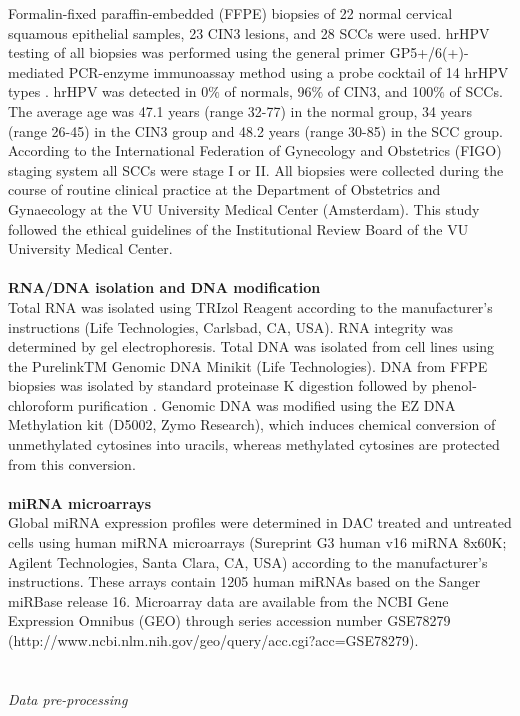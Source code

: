 Formalin-fixed paraffin-embedded (FFPE) biopsies of 22 normal cervical squamous epithelial samples, 23 CIN3 lesions, and 28 SCCs were used. hrHPV testing of all biopsies was performed using the general primer GP5+/6(+)-mediated PCR-enzyme immunoassay method using a probe cocktail of 14 hrHPV types \cite{Jacobs1997}. hrHPV was detected in 0$\%$ of normals, 96$\%$ of CIN3, and 100$\%$ of SCCs. The average age was 47.1 years (range 32-77) in the normal group, 34 years (range 26-45) in the CIN3 group and 48.2 years (range 30-85) in the SCC group. According to the International Federation of Gynecology and Obstetrics (FIGO) staging system all SCCs were stage I or II. All biopsies were collected during the course of routine clinical practice at the Department of Obstetrics and Gynaecology at the VU University Medical Center (Amsterdam). This study followed the ethical guidelines of the Institutional Review Board of the VU University Medical Center.
\\
\\
\textbf{RNA/DNA isolation and DNA modification}
\\
Total RNA was isolated using TRIzol Reagent according to the manufacturer’s instructions (Life Technologies, Carlsbad, CA, USA). RNA integrity was determined by gel electrophoresis. Total DNA was isolated from cell lines using the PurelinkTM Genomic DNA Minikit (Life Technologies). DNA from FFPE biopsies was isolated by standard proteinase K digestion followed by phenol-chloroform purification \cite{VanZeeburg2005}.
Genomic DNA was modified using the EZ DNA Methylation kit (D5002, Zymo Research), which induces chemical conversion of unmethylated cytosines into uracils, whereas methylated cytosines are protected from this conversion.
\\
\\
\textbf{miRNA microarrays}
\\
Global miRNA expression profiles were determined in DAC treated and untreated cells using human miRNA microarrays (Sureprint G3 human v16 miRNA 8x60K; Agilent Technologies, Santa Clara, CA, USA) according to the manufacturer's instructions. These arrays contain 1205 human miRNAs based on the Sanger miRBase release 16. Microarray data are available from the NCBI Gene Expression Omnibus (GEO) through series accession number GSE78279\\ (http://www.ncbi.nlm.nih.gov/geo/query/acc.cgi?acc=GSE78279).\\
\\
\\
\textit{Data pre-processing}
